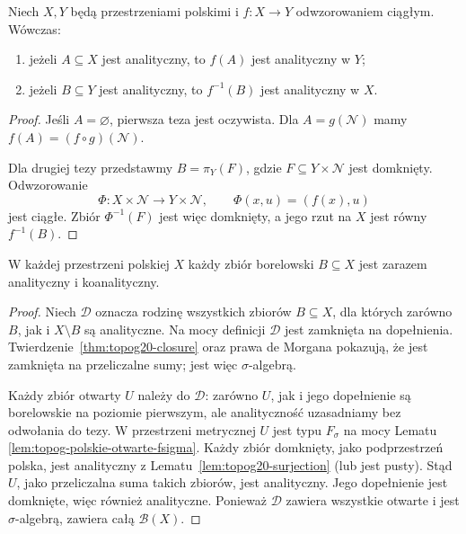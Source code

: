 \begin{stwierdzenie}
\label{prop:topog20-maps}
Niech \(X,Y\) będą przestrzeniami
polskimi i \(f\colon X\to Y\)
odwzorowaniem ciągłym.
Wówczas:
\begin{enumerate}[label=\textup{(\roman*)}]
\item jeżeli \(A\subseteq X\)
jest analityczny, to \(f(A)\)
jest analityczny w \(Y\);
\item jeżeli \(B\subseteq Y\)
jest analityczny, to
\(f^{-1}(B)\) jest analityczny w \(X\).
\end{enumerate}
\end{stwierdzenie}
\begin{proof}
Jeśli \(A=\varnothing\),
pierwsza teza jest oczywista.
Dla \(A=g(\mathcal N)\)
mamy \(f(A)=(f\circ g)(\mathcal N)\).

Dla drugiej tezy przedstawmy
\(B=\pi_Y(F)\), gdzie
\(F\subseteq Y\times\mathcal N\)
jest domknięty.
Odwzorowanie
\[
 \Phi\colon X\times\mathcal N
     \longrightarrow Y\times\mathcal N,
 \qquad \Phi(x,u)=(f(x),u)
\]
jest ciągłe.
Zbiór \(\Phi^{-1}(F)\)
jest więc domknięty,
a jego rzut na \(X\)
jest równy \(f^{-1}(B)\).
\end{proof}

\begin{wniosek}
\label{cor:topog20-borel}
W każdej przestrzeni polskiej \(X\)
każdy zbiór borelowski \(B\subseteq X\)
jest zarazem analityczny i koanalityczny.
\end{wniosek}
\begin{proof}
Niech \(\mathcal D\)
oznacza rodzinę wszystkich
zbiorów \(B\subseteq X\),
dla których zarówno \(B\),
jak i \(X\setminus B\)
są analityczne.
Na mocy definicji
\(\mathcal D\) jest zamknięta
na dopełnienia.
Twierdzenie~\ref{thm:topog20-closure}
oraz prawa de Morgana
pokazują, że jest zamknięta
na przeliczalne sumy;
jest więc \(\sigma\)-algebrą.

Każdy zbiór otwarty \(U\)
należy do \(\mathcal D\):
zarówno \(U\), jak i
jego dopełnienie są borelowskie
na poziomie pierwszym,
ale analityczność uzasadniamy
bez odwołania do tezy.
W przestrzeni metrycznej
\(U\) jest typu \(F_\sigma\)
na mocy Lematu~
\ref{lem:topog-polskie-otwarte-fsigma}.
Każdy zbiór domknięty,
jako podprzestrzeń polska,
jest analityczny z
Lematu~\ref{lem:topog20-surjection}
(lub jest pusty).
Stąd \(U\), jako przeliczalna
suma takich zbiorów, jest
analityczny. Jego dopełnienie
jest domknięte, więc również
analityczne.
Ponieważ \(\mathcal D\)
zawiera wszystkie otwarte
i jest \(\sigma\)-algebrą,
zawiera całą
\(\mathcal B(X)\).
\end{proof}


